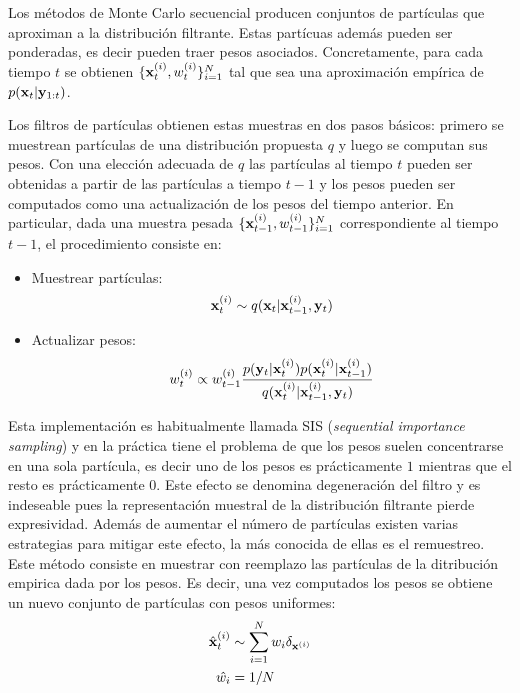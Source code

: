 Los métodos de Monte Carlo secuencial producen conjuntos de partículas que aproximan a la distribución filtrante. Estas partícuas además pueden ser ponderadas, es decir pueden traer pesos asociados. Concretamente, para cada tiempo $t$ se obtienen $\{\mathbf{x}_t^{(i)}, w_t^{(i)}\}_{i=1}^{N}$ tal que sea una aproximación empírica de $p(\mathbf{x}_t | \mathbf{y}_{1:t})$.

Los filtros de partículas obtienen estas muestras en dos pasos básicos: primero se muestrean partículas de una distribución propuesta $q$ y luego se computan sus pesos. Con una elección adecuada de $q$ las partículas al tiempo $t$ pueden ser obtenidas a partir de las partículas a tiempo $t-1$ y los pesos pueden ser computados como una actualización de los pesos del tiempo anterior. En particular, dada una muestra pesada $\{\mathbf{x}_{t-1}^{(i)}, w_{t-1}^{(i)}\}_{i=1}^{N}$ correspondiente al tiempo $t-1$, el procedimiento consiste en:
\begin{itemize}
    \item Muestrear partículas:
        \begin{align*}
            \mathbf{x}_{t}^{(i)} \sim q(\mathbf{x}_t | \mathbf{x}_{t-1}^{(i)}, \mathbf{y}_t)
        \end{align*}
    \item Actualizar pesos: 
        \begin{align*}
            w_{t}^{(i)} \propto w_{t-1}^{(i)} \frac{p(\mathbf{y}_t | \mathbf{x}_t^{(i)}) p(\mathbf{x}_t^{(i)} | \mathbf{x}_{t-1}^{(i)})}{q(\mathbf{x}_t^{(i)} | \mathbf{x}_{t-1}^{(i)}, \mathbf{y}_t)}
        \end{align*}
\end{itemize}

Esta implementación es habitualmente llamada SIS (\textit{sequential importance sampling}) y en la práctica tiene el problema de que los pesos suelen concentrarse en una sola partícula, es decir uno de los pesos es prácticamente $1$ mientras que el resto es prácticamente $0$. Este efecto se denomina degeneración del filtro y es indeseable pues la representación muestral de la distribución filtrante pierde expresividad. Además de aumentar el número de partículas existen varias estrategias para mitigar este efecto, la más conocida de ellas es el remuestreo. Este método consiste en muestrar con reemplazo las partículas de la ditribución empirica dada por los pesos. Es decir, una vez computados los pesos se obtiene un nuevo conjunto de partículas con pesos uniformes:
\begin{align*}
    \hat{\mathbf{x}}_t^{(i)} &\sim \sum_{i=1}^N w_i \delta_{\mathbf{x}^{(i)}} \\
    \hat{w_i} &= 1 / N
\end{align*}

